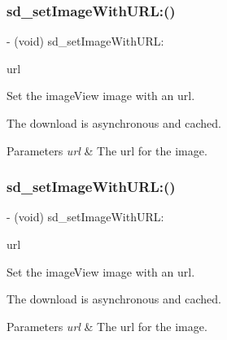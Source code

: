 \subsubsection{\texorpdfstring{sd\+\_\+set\+Image\+With\+U\+R\+L\+:()}{sd\_setImageWithURL:()}\hspace{0.1cm}{\footnotesize\ttfamily [1/3]}}
{\footnotesize\ttfamily -\/ (void) sd\+\_\+set\+Image\+With\+U\+R\+L\+: \begin{DoxyParamCaption}\item[{(N\+S\+U\+RL $\ast$)}]{url }\end{DoxyParamCaption}}

Set the image\+View {\ttfamily image} with an {\ttfamily url}.

The download is asynchronous and cached.


\begin{DoxyParams}{Parameters}
{\em url} & The url for the image. \\
\hline
\end{DoxyParams}
\mbox{\label{category_u_i_image_view_07_web_cache_08_a577e2abff6711b6eb793b6cd19f11dd3}} 
\subsubsection{\texorpdfstring{sd\+\_\+set\+Image\+With\+U\+R\+L\+:()}{sd\_setImageWithURL:()}\hspace{0.1cm}{\footnotesize\ttfamily [2/3]}}
{\footnotesize\ttfamily -\/ (void) sd\+\_\+set\+Image\+With\+U\+R\+L\+: \begin{DoxyParamCaption}\item[{(N\+S\+U\+RL $\ast$)}]{url }\end{DoxyParamCaption}}

Set the image\+View {\ttfamily image} with an {\ttfamily url}.

The download is asynchronous and cached.


\begin{DoxyParams}{Parameters}
{\em url} & The url for the image. \\
\hline
\end{DoxyParams}
\mbox{\label{category_u_i_image_view_07_web_cache_08_a577e2abff6711b6eb793b6cd19f11dd3}} 
